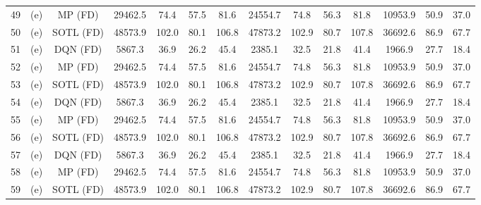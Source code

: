 \begin{table}[htbp]
\begin{tabular}{|c|c|c|c|c|c|c|c|c|c|c|c|c|c|}
49 &  (e) &    MP (FD) & 29462.5 &  74.4 &  57.5 &  81.6 & 24554.7 &  74.8 &  56.3 &  81.8 & 10953.9 &  50.9 & 37.0 \\
50 &  (e) &  SOTL (FD) & 48573.9 & 102.0 &  80.1 & 106.8 & 47873.2 & 102.9 &  80.7 & 107.8 & 36692.6 &  86.9 & 67.7 \\
51 &  (e) &   DQN (FD) &  5867.3 &  36.9 &  26.2 &  45.4 &  2385.1 &  32.5 &  21.8 &  41.4 &  1966.9 &  27.7 & 18.4 \\
52 &  (e) &    MP (FD) & 29462.5 &  74.4 &  57.5 &  81.6 & 24554.7 &  74.8 &  56.3 &  81.8 & 10953.9 &  50.9 & 37.0 \\
53 &  (e) &  SOTL (FD) & 48573.9 & 102.0 &  80.1 & 106.8 & 47873.2 & 102.9 &  80.7 & 107.8 & 36692.6 &  86.9 & 67.7 \\
54 &  (e) &   DQN (FD) &  5867.3 &  36.9 &  26.2 &  45.4 &  2385.1 &  32.5 &  21.8 &  41.4 &  1966.9 &  27.7 & 18.4 \\
55 &  (e) &    MP (FD) & 29462.5 &  74.4 &  57.5 &  81.6 & 24554.7 &  74.8 &  56.3 &  81.8 & 10953.9 &  50.9 & 37.0 \\
56 &  (e) &  SOTL (FD) & 48573.9 & 102.0 &  80.1 & 106.8 & 47873.2 & 102.9 &  80.7 & 107.8 & 36692.6 &  86.9 & 67.7 \\
57 &  (e) &   DQN (FD) &  5867.3 &  36.9 &  26.2 &  45.4 &  2385.1 &  32.5 &  21.8 &  41.4 &  1966.9 &  27.7 & 18.4 \\
58 &  (e) &    MP (FD) & 29462.5 &  74.4 &  57.5 &  81.6 & 24554.7 &  74.8 &  56.3 &  81.8 & 10953.9 &  50.9 & 37.0 \\
59 &  (e) &  SOTL (FD) & 48573.9 & 102.0 &  80.1 & 106.8 & 47873.2 & 102.9 &  80.7 & 107.8 & 36692.6 &  86.9 & 67.7 \\
\hline
\end{tabular}
\end{table}

\pagebreak

